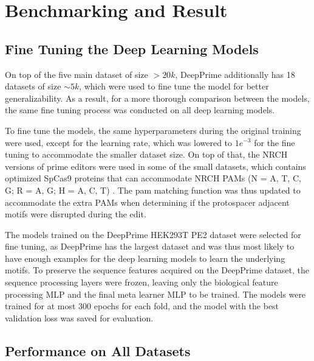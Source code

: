 \chapter{Benchmarking and Result}

\minitoc

\section{Fine Tuning the Deep Learning Models}

On top of the five main dataset of size $> 20k$, DeepPrime additionally has 18 datasets of size $\sim5k$, which were used to fine tune the model for better generalizability. As a result, for a more thorough comparison between the models, the same fine tuning process was conducted on all deep learning models.

To fine tune the models, the same hyperparameters during the original training were used, except for the learning rate, which was lowered to $1e^{-3}$ for the fine tuning to accommodate the smaller dataset size. On top of that, the NRCH versions of prime editors were used in some of the small datasets, which contains optimized SpCas9 proteins that can accommodate NRCH PAMs (N = A, T, C, G; R = A, G; H = A, C, T) \cite{millerContinuousEvolutionSpCas92020}. The pam matching function was thus updated to accommodate the extra PAMs when determining if the protospacer adjacent motifs were disrupted during the edit.

The models trained on the DeepPrime HEK293T PE2 dataset were selected for fine tuning, as DeepPrime has the largest dataset and was thus most likely to have enough examples for the deep learning models to learn the underlying motifs. To preserve the sequence features acquired on the DeepPrime dataset, the sequence processing layers were frozen, leaving only the biological feature processing MLP and the final meta learner MLP to be trained. The models were trained for at most 300 epochs for each fold, and the model with the best validation loss was saved for evaluation.


\section{Performance on All Datasets}

